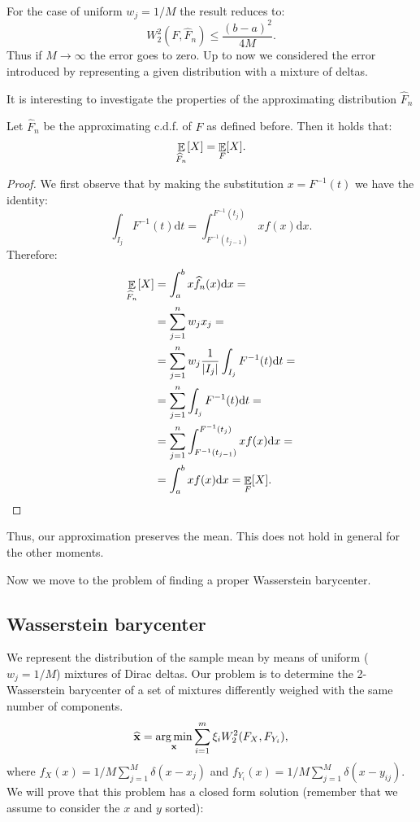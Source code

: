 For the case of uniform $w_j = 1/M$ the result reduces to:
\begin{equation}
	W_2^2(F, \widehat{F}_n) \le \frac{(b-a)^2}{4M}.
\end{equation}
Thus if $M\rightarrow \infty$ the error goes to zero. Up to now we considered the error introduced by representing a given distribution with a mixture of deltas. 

It is interesting to investigate the properties of the approximating distribution $\widehat{F}_n$

\begin{prop}
	Let $\widehat{F}_n$ be the approximating c.d.f. of $F$ as defined before. Then it holds that:
    \begin{equation}
    	\displaystyle \mathop{\mathbb{E}}_{\widehat{F}_n} [X] = \displaystyle \mathop{\mathbb{E}}_{F} [X].
    \end{equation}
\end{prop}

\begin{proof}
	We first observe that by making the substitution $x = F^{-1}(t)$ we have the identity:
    \begin{equation}
    	\int_{I_j} F^{-1}(t) \mathrm{d} t = \int_{F^{-1}(t_{j-1})}^{F^{-1}(t_{j})} x f(x) \mathrm{d}x.
    \end{equation}
    Therefore:
    \begin{align*}
    	\displaystyle \mathop{\mathbb{E}}_{\widehat{F}_n} [X] & =\int_a^b x \widehat{f}_n(x) \mathrm{d}x = \\
        & = \sum_{j=1}^n w_j x_j = \\
        & = \sum_{j=1}^n w_j \frac{1}{|I_j|} \int_{I_j} F^{-1}(t) \mathrm{d} t = \\
        & = \sum_{j=1}^n \int_{I_j} F^{-1}(t) \mathrm{d} t = \\
        & = \sum_{j=1}^n \int_{F^{-1}(t_{j-1})}^{F^{-1}(t_{j})} x f(x) \mathrm{d}x = \\
        & = \int_{a}^{b} x f(x) \mathrm{d}x = \displaystyle \mathop{\mathbb{E}}_{F} [X].
    \end{align*}
\end{proof}

Thus, our approximation preserves the mean. This does not hold in general for the other moments.


Now we move to the problem of finding a proper Wasserstein barycenter.
\subsection{Wasserstein barycenter} 
We represent the distribution of the sample mean by means of uniform ($w_j=1/M$) mixtures of Dirac deltas. Our problem is to determine the 2-Wasserstein barycenter of a set of mixtures differently weighed with the same number of components. 
\begin{equation}
\label{eq:problem}
	\widehat{\bm{\mathbf{x}}} = \operatorname*{arg\,min}_{\bm{\mathbf{x}}} \sum_{i=1}^m \xi_i W_2^2(F_X, F_{Y_i}),
\end{equation}
where $f_X(x) = 1/M \sum_{j=1}^M \delta(x-x_j)$ and $f_{Y_i}(x) = 1/M \sum_{j=1}^M \delta(x-y_{ij})$. We will prove that this problem has a closed form solution (remember that we assume to consider the $x$ and $y$ sorted):

